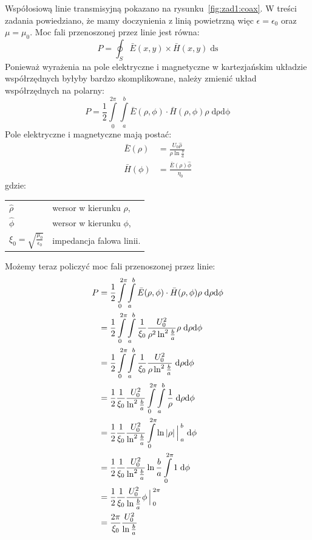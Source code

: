 \documentclass[rep.tex]{subfiles}
\begin{document}
Współosiową linie transmisyjną pokazano na rysunku~\ref{fig:zad1:coax}.
W treści zadania powiedziano, że mamy doczynienia z linią powietrzną więc $\epsilon = \epsilon_0$ oraz $\mu = \mu_0$.
Moc fali przenoszonej przez linie jest równa:
\begin{equation}
  P = \oint_S\bar{E}(x, y) \times \bar{H}(x, y) \; \mathrm{ds}
\end{equation}
Ponieważ wyrażenia na pole elektryczne i magnetyczne w kartezjańskim układzie współrzędnych byłyby bardzo skomplikowane,
należy zmienić układ współrzędnych na polarny:
\begin{equation}
  P = \frac{1}{2} \int\limits_0^{2\pi}\int\limits_a^b \bar{E}(\rho, \phi) \cdot \bar{H}(\rho, \phi) \rho \; \mathrm{d\rho} \mathrm{d\phi}
\end{equation}
Pole elektryczne i magnetyczne mają postać:
\begin{align}
  \bar{E}(\rho)    & = \frac{U_0\hat{\rho}}{\rho \ln \frac{b}{a}} \\
  \bar{H}(\phi) & = \frac{\bar{E}(\rho)\hat{\phi}}{\eta_0}
\end{align}
gdzie: \\
\begin{tabular}{l @{ - } l}
  $\hat{\rho}$ & wersor w kierunku $\rho$, \\
  $\hat{\phi}$ & wersor w kierunku $\phi$, \\
  $\xi_0 = \sqrt{\frac{\mu_0}{\epsilon_0}}$ & impedancja falowa linii. \\
\end{tabular}

Możemy teraz policzyć moc fali przenoszonej przez linie:
\begin{align}
  P & =  \frac{1}{2} \int\limits_0^{2\pi}\int\limits_a^b \bar{E}(\rho, \phi) \cdot \bar{H}(\rho, \phi) \rho \; \mathrm{d\rho} \mathrm{d\phi} \nonumber \\
    & =  \frac{1}{2} \int\limits_0^{2\pi}\int\limits_a^b \frac{1}{\xi_0}\frac{U_0^2}{\rho^2\ln^2\frac{b}{a}} \rho \; \mathrm{d\rho} \mathrm{d\phi} \nonumber \\
    & =  \frac{1}{2} \int\limits_0^{2\pi}\int\limits_a^b \frac{1}{\xi_0}\frac{U_0^2}{\rho\ln^2\frac{b}{a}} \; \mathrm{d\rho} \mathrm{d\phi} \nonumber \\
    & =  \frac{1}{2} \frac{1}{\xi_0}\frac{U_0^2}{\ln^2\frac{b}{a}} \int\limits_0^{2\pi}\int\limits_a^b \frac{1}{\rho} \; \mathrm{d\rho} \mathrm{d\phi} \nonumber \\
    & =  \frac{1}{2} \frac{1}{\xi_0}\frac{U_0^2}{\ln^2\frac{b}{a}} \int\limits_0^{2\pi} \ln|\rho|\Big\arrowvert_a^b \; \mathrm{d\phi} \nonumber \\
    & =  \frac{1}{2} \frac{1}{\xi_0}\frac{U_0^2}{\ln^2\frac{b}{a}} \ln\frac{b}{a} \int\limits_0^{2\pi} 1 \; \mathrm{d\phi} \nonumber \\
    & =  \frac{1}{2} \frac{1}{\xi_0}\frac{U_0^2}{\ln\frac{b}{a}} \phi\Big\arrowvert_0^{2\pi} \nonumber \\
    & =  \frac{2\pi}{\xi_0}\frac{U_0^2}{\ln\frac{b}{a}} \label{eqn:zad1:power}
\end{align}
\end{document}
